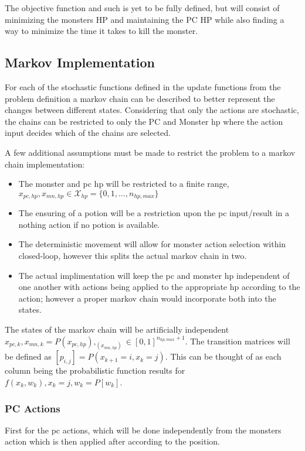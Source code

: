\documentclass[9pt, onecolumn]{report}
\begin{document}
The objective function and such is yet to be fully defined, but will consist of minimizing the monsters HP and maintaining the PC HP while also finding a way to minimize the time it takes to kill the monster.

\subsection{Markov Implementation}
For each of the stochastic functions defined in the update functions from the problem definition a markov chain can be described to better represent the changes between different states.
Considering that only the actions are stochastic, the chains can be restricted to only the PC and Monster hp where the action input decides which of the chains are selected.

A few additional assumptions must be made to restrict the problem to a markov chain implementation:
\begin{itemize}
    \item The monster and pc hp will be restricted to a finite range, $x_{pc,hp},x_{mn,hp} \in \mathcal{X}_{hp} = \{0,1,\dots, n_{hp,max}\}$
    \item The ensuring of a potion will be a restriction upon the pc input/result in a nothing action if no potion is available.
    \item The deterministic movement will allow for monster action selection within closed-loop, however this splits the actual markov chain in two.
    \item The actual implimentation will keep the pc and monster hp independent of one another with actions being applied to the appropriate hp according to the action; however a proper markov chain would incorporate both into the states.
\end{itemize}

The states of the markov chain will be artificially independent $x_{pc,k}, x_{mn,k} = P(x_{pc,hp}), _(x_{mn,hp}) \in [0,1]^{n_{hp,max}+1}$.
The transition matrices will be defined as $[p_{i,j}] = P(x_{k+1} = i, x_{k} = j)$.
This can be thought of as each column being the probabilistic function results for $f(x_k,w_k), x_{k} = j, w_k = P[w_k]$. 

\subsubsection{PC Actions}
First for the pc actions, which will be done independently from the monsters action which is then applied after according to the position.
\end{document}
